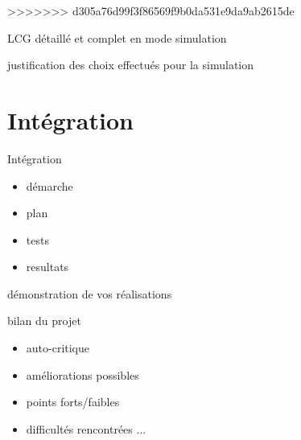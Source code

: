 \documentclass{beamer}
\begin{document}
\begin{frame}
\begin{center}
	    \end{center}
>>>>>>> d305a76d99f3f86569f9b0da531e9da9ab2615de
	\end{frame}

	\begin{frame}
		LCG détaillé et complet en mode simulation
	\end{frame}

	\begin{frame}
		justification des choix effectués pour la simulation 
	\end{frame}

\section{Intégration}
	\begin{frame}
		Intégration
		\begin{itemize}
			\item démarche
			\item plan
			\item tests
			\item resultats
		\end{itemize}
	\end{frame}

	\begin{frame}
		démonstration de vos réalisations
	\end{frame}

	\begin{frame}
		bilan du projet
		\begin{itemize}
			\item auto-critique
			\item améliorations possibles
			\item points forts/faibles
			\item difficultés rencontrées ...
		\end{itemize}
	\end{frame}
\end{document}
